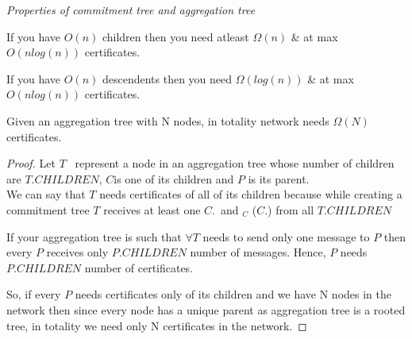 \textit{Properties of commitment tree and aggregation tree}

	If you have $O(n)$ children then you need atleast $\Omega(n)$ \& at max $O(nlog(n))$ certificates.

	If you have $O(n)$ descendents then you need $\Omega(log(n))$  \& at max $O(nlog(n))$ certificates.


\begin{theorem} \label{min certificates}
	Given an aggregation tree with N nodes, in totality network needs $\Omega(N)$ certificates.
\end{theorem}

\begin{proof}
	
	Let $T$ \ represent a node in an aggregation tree whose number of children are $T$.$CHILDREN$, $C$is one of its children and $P$ is its parent.\\
	We can say that $T$ needs certificates of all of its children because while creating a commitment tree $T$ receives at least one $C$.\msg \ and \sign$_{C}$ ($C$.\msg)  from all $T$.$CHILDREN$

	If your aggregation tree is such that $\forall T$ needs to send only one message to $P$ then every $P$ receives only $P.CHILDREN$ number of messages. Hence, $P$ needs $P.CHILDREN$ number of certificates.

	So, if every $P$ needs certificates only of its children  and we have N nodes in the network then since every node has a unique parent as aggregation tree is a rooted tree, in totality we need only N certificates in the network.

\end{proof}
